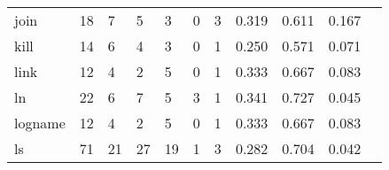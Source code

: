 \begin{longtable}{lp{1.20cm}p{1.20cm}p{1.20cm}p{1.20cm}p{1.20cm}p{1.20cm}p{1.20cm}p{1.20cm}p{1.20cm}p{1.20cm}}
join      &                                    18 &                                                  7 &                                                  5 &                                                  3 &                                                  0 &                                                  3 &                                         0.319 &                                              0.611 &                                              0.167 \\
kill      &                                    14 &                                                  6 &                                                  4 &                                                  3 &                                                  0 &                                                  1 &                                         0.250 &                                              0.571 &                                              0.071 \\
link      &                                    12 &                                                  4 &                                                  2 &                                                  5 &                                                  0 &                                                  1 &                                         0.333 &                                              0.667 &                                              0.083 \\
ln        &                                    22 &                                                  6 &                                                  7 &                                                  5 &                                                  3 &                                                  1 &                                         0.341 &                                              0.727 &                                              0.045 \\
logname   &                                    12 &                                                  4 &                                                  2 &                                                  5 &                                                  0 &                                                  1 &                                         0.333 &                                              0.667 &                                              0.083 \\
ls        &                                    71 &                                                 21 &                                                 27 &                                                 19 &                                                  1 &                                                  3 &                                         0.282 &                                              0.704 &                                              0.042 \\

\end{longtable}
